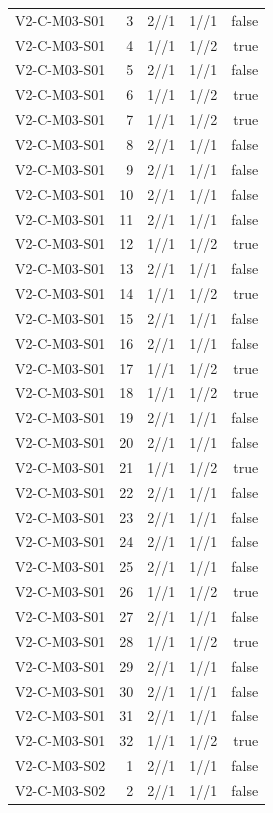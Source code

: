 {\begin{longtable}{lrrrr}
V2-C-M03-S01 & 3 & 2//1 & 1//1 & false \\
V2-C-M03-S01 & 4 & 1//1 & 1//2 & true \\
V2-C-M03-S01 & 5 & 2//1 & 1//1 & false \\
V2-C-M03-S01 & 6 & 1//1 & 1//2 & true \\
V2-C-M03-S01 & 7 & 1//1 & 1//2 & true \\
V2-C-M03-S01 & 8 & 2//1 & 1//1 & false \\
V2-C-M03-S01 & 9 & 2//1 & 1//1 & false \\
V2-C-M03-S01 & 10 & 2//1 & 1//1 & false \\
V2-C-M03-S01 & 11 & 2//1 & 1//1 & false \\
V2-C-M03-S01 & 12 & 1//1 & 1//2 & true \\
V2-C-M03-S01 & 13 & 2//1 & 1//1 & false \\
V2-C-M03-S01 & 14 & 1//1 & 1//2 & true \\
V2-C-M03-S01 & 15 & 2//1 & 1//1 & false \\
V2-C-M03-S01 & 16 & 2//1 & 1//1 & false \\
V2-C-M03-S01 & 17 & 1//1 & 1//2 & true \\
V2-C-M03-S01 & 18 & 1//1 & 1//2 & true \\
V2-C-M03-S01 & 19 & 2//1 & 1//1 & false \\
V2-C-M03-S01 & 20 & 2//1 & 1//1 & false \\
V2-C-M03-S01 & 21 & 1//1 & 1//2 & true \\
V2-C-M03-S01 & 22 & 2//1 & 1//1 & false \\
V2-C-M03-S01 & 23 & 2//1 & 1//1 & false \\
V2-C-M03-S01 & 24 & 2//1 & 1//1 & false \\
V2-C-M03-S01 & 25 & 2//1 & 1//1 & false \\
V2-C-M03-S01 & 26 & 1//1 & 1//2 & true \\
V2-C-M03-S01 & 27 & 2//1 & 1//1 & false \\
V2-C-M03-S01 & 28 & 1//1 & 1//2 & true \\
V2-C-M03-S01 & 29 & 2//1 & 1//1 & false \\
V2-C-M03-S01 & 30 & 2//1 & 1//1 & false \\
V2-C-M03-S01 & 31 & 2//1 & 1//1 & false \\
V2-C-M03-S01 & 32 & 1//1 & 1//2 & true \\
V2-C-M03-S02 & 1 & 2//1 & 1//1 & false \\
V2-C-M03-S02 & 2 & 2//1 & 1//1 & false \\

\end{longtable}}
